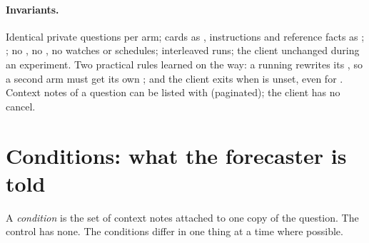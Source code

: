 \documentclass[11pt,a4paper]{article}
\begin{document}
\paragraph{Invariants.} Identical private questions per arm; cards as , instructions and reference facts
as ; ; no , no , no
watches or schedules; interleaved runs; the client unchanged during an experiment. Two practical rules learned on the
way: a running  rewrites its , so a second arm must get its own ; and the
client exits when  is unset, even for . Context notes of a question can be listed with
 (paginated); the client has no cancel.

\section{Conditions: what the forecaster is told}\label{sec:conditions}
A \emph{condition} is the set of context notes attached to one copy of the question. The control has none. The
conditions differ in one thing at a time where possible.
\end{document}
